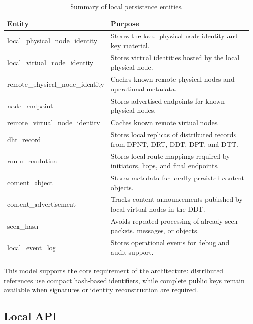 \documentclass[12pt,a4paper]{article}
\newcommand{\codebreak}[1]{{\footnotesize\ttfamily #1}}
\begin{document}
\begin{table}[H]
\centering
\caption{Summary of local persistence entities.}
\label{tab:persistence-summary}
\begin{tabularx}{\textwidth}{L{0.27\textwidth} Y}
\toprule
\textbf{Entity} & \textbf{Purpose} \\
\midrule
\codebreak{local\_\allowbreak{}physical\_\allowbreak{}node\_\allowbreak{}identity} & Stores the local physical node identity and key material. \\
\codebreak{local\_\allowbreak{}virtual\_\allowbreak{}node\_\allowbreak{}identity} & Stores virtual identities hosted by the local physical node. \\
\codebreak{remote\_\allowbreak{}physical\_\allowbreak{}node\_\allowbreak{}identity} & Caches known remote physical nodes and operational metadata. \\
\codebreak{node\_\allowbreak{}endpoint} & Stores advertised endpoints for known physical nodes. \\
\codebreak{remote\_\allowbreak{}virtual\_\allowbreak{}node\_\allowbreak{}identity} & Caches known remote virtual nodes. \\
\codebreak{dht\_\allowbreak{}record} & Stores local replicas of distributed records from DPNT, DRT, DDT, DPT, and DTT. \\
\codebreak{route\_\allowbreak{}resolution} & Stores local route mappings required by initiators, hops, and final endpoints. \\
\codebreak{content\_\allowbreak{}object} & Stores metadata for locally persisted content objects. \\
\codebreak{content\_\allowbreak{}advertisement} & Tracks content announcements published by local virtual nodes in the DDT. \\
\codebreak{seen\_\allowbreak{}hash} & Avoids repeated processing of already seen packets, messages, or objects. \\
\codebreak{local\_\allowbreak{}event\_\allowbreak{}log} & Stores operational events for debug and audit support. \\
\bottomrule
\end{tabularx}
\end{table}

This model supports the core requirement of the architecture: distributed references use compact hash-based identifiers, while complete public keys remain available when signatures or identity reconstruction are required.

\subsection{Local API}
\label{sec:local-api-implementation}
\end{document}
